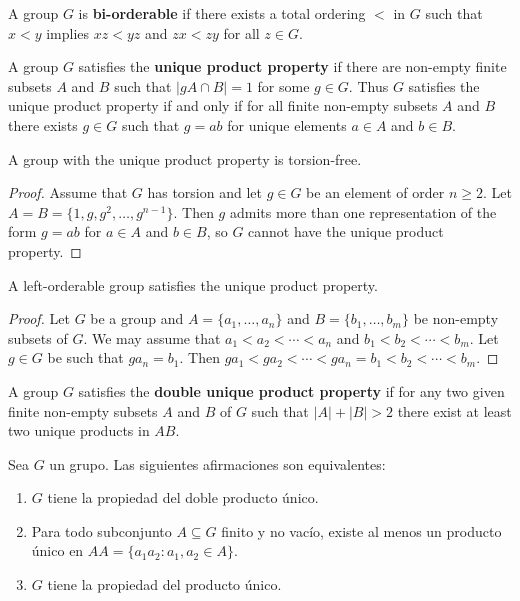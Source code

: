 A group $G$ is \textbf{bi-orderable} if there exists a total ordering $<$ in $G$ 
such that $x<y$ implies $xz<yz$ and $zx<zy$ for all $z\in G$. 

A group $G$ satisfies the \textbf{unique product property} if there are non-empty
finite subsets $A$ and $B$ such that $|gA\cap B|=1$ for some $g\in G$. Thus $G$ 
satisfies the unique product property if and only if for all finite non-empty subsets
$A$ and $B$ there exists $g\in G$ such that $g=ab$ for unique elements 
$a\in A$ and $b\in B$.  

\begin{proposition}
	A group with the unique product property is torsion-free.	
\end{proposition}

\begin{proof}
	Assume that $G$ has torsion and let $g\in G$ be an element of order $n\geq2$. 
	Let $A=B=\{1,g,g^2,\dots,g^{n-1}\}$. Then $g$ admits more than one representation
	of the form $g=ab$ for $a\in A$ and $b\in B$, so $G$ cannot have the unique product property. 
\end{proof}

\begin{proposition}
	A left-orderable group satisfies the unique product property.
\end{proposition}

\begin{proof}
	Let $G$ be a group and 
    $A=\{a_1,\dots,a_n\}$ and $B=\{b_1,\dots,b_m\}$ be non-empty 
    subsets of $G$. We may assume that $a_1<a_2<\cdots<a_n$ and
    $b_1<b_2<\cdots<b_m$. Let $g\in G$ be such that $ga_n=b_1$. Then
    $ga_1<ga_2<\cdots<ga_n=b_1<b_2<\cdots<b_m$. 
\end{proof}

A group $G$ satisfies the \textbf{double unique product property} if for any two given finite non-empty 
subsets $A$ and $B$ of $G$ such that $|A|+|B|>2$ there exist at least two unique products in $AB$. 

\begin{theorem}[Strojnowski]
	\label{thm:Strojnowski}
	Sea $G$ un grupo. Las siguientes afirmaciones son equivalentes:
	\begin{enumerate}
		\item $G$ tiene la propiedad del doble producto único.
		\item Para todo subconjunto $A\subseteq G$ finito y no vacío, existe al
			menos un producto único en $AA=\{a_1a_2:a_1,a_2\in A\}$.
		\item $G$ tiene la propiedad del producto único.
	\end{enumerate}
\end{theorem}

